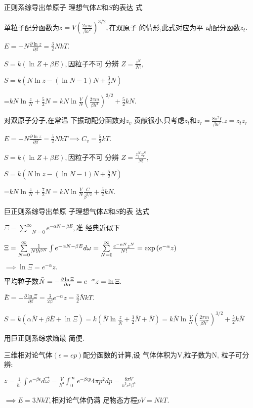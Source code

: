 \documentclass{ctexart}
\begin{document}
正则系综导出单原子%
理想气体$E$和$S$的表达%
式

单粒子配分函数为$z=V\left( 
\frac{2\pi m}{\beta h^{2}}\right) ^{3/2},$在双原子%
的情形,此式对应为平%
动配分函数$z_{t}.$

$E=-N\frac{\partial \ln z}{\partial \beta }=\frac{3}{2}NkT.$

$S=k\left( \ln Z+\beta E\right) ,$因粒子不可%
分辨 $Z=\frac{z^{N}}{N!},$

$S=k\left( N\ln z-\left( \ln N-1\right) N+\frac{3}{2}N\right) $

=$kN\ln \frac{z}{N}+\frac{5}{2}N=kN\ln \frac{V}{N}\left( \frac{2\pi m}{\beta
h^{2}}\right) ^{3/2}+\frac{5}{2}kN.$

对双原子分子,在常温%
下振动配分函数对$z_{v}$%
贡献很小,只考虑$z_{t}$和$%
z_{r}=\frac{8\pi ^{2}I}{\beta h^{2}}.z=z_{t}z_{r}$

$E=-N\frac{\partial \ln z}{\partial \beta }=\frac{5}{2}NkT\implies C_{v}=%
\frac{5}{2}kT.$

$S=k\left( \ln Z+\beta E\right) ,$因粒子不可%
分辨 $Z=\frac{z_{t}^{N}z_{r}^{N}}{N!},$

$S=k\left( N\ln z-\left( \ln N-1\right) N+\frac{5}{2}N\right) $

=$kN\ln \frac{z}{N}+\frac{7}{2}N=kN\ln \frac{V}{N}\frac{C}{\beta ^{5/2}}+%
\frac{5}{2}kN.$

巨正则系综导出单原%
子理想气体$E$和$S$的表%
达式

$\Xi =\underset{N=0}{\overset{\infty }{\sum }}e^{-\alpha N-\beta E},$准%
经典近似下

$\Xi =\underset{N=0}{\overset{\infty }{\sum }}\frac{1}{N!h^{3N}}\int
e^{-\alpha N-\beta E}d\omega =\underset{N=0}{\overset{\infty }{\sum }}\frac{%
e^{-\alpha N}z^{N}}{N!}=\exp \left( e^{-\alpha }z\right) $

$\implies \ln \Xi =e^{-\alpha }z.$

平均粒子数$\bar{N}=-\frac{\partial \ln \Xi }{%
\partial \alpha }=e^{-\alpha }z=\ln \Xi .$

$\bar{E}=-\frac{\partial \ln \Xi }{\partial \beta }=\frac{3}{2\beta }%
e^{-\alpha }z=\frac{3}{2}\bar{N}kT.$

$S=k\left( \alpha \bar{N}+\beta \bar{E}+\ln \Xi \right) =k\left( \bar{N}\ln 
\frac{z}{\bar{N}}+\frac{3}{2}\bar{N}+\bar{N}\right) =k\bar{N}\ln \frac{V}{N}%
\left( \frac{2\pi m}{\beta h^{2}}\right) ^{3/2}+\frac{5}{2}k\bar{N}$

用巨正则系综求熵最%
简便.

三维相对论气体$\left( \epsilon
=cp\right) $配分函数的计算,设%
气体体积为V,粒子数为N,%
粒子可分辨:

$z=\frac{1}{h^{3}}\int e^{-\beta \epsilon }d\vec{\omega}=\frac{V}{h^{3}}%
\int_{0}^{\infty }e^{-\beta cp}4\pi p^{2}dp=\frac{8\pi V}{h^{3}c^{3}\beta
^{3}}$

$\implies E=3NkT,$相对论气体仍满%
足物态方程$pV=NkT.$
\end{document}
